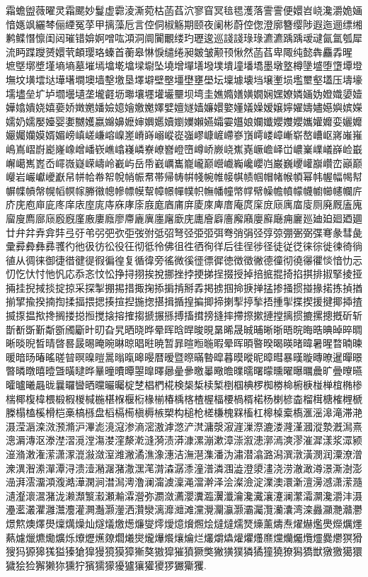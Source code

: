 霜蟾盥薇曜灵霜颸妙鬘虚霩淩澌菀枯菡萏泬寥窅冥毰毸濩落霅霅便嬛岧峣瀺灂姽婳愔嫕飒纚棽俪緸冤莩甲摛藻卮言倥侗椒觞期颐夜阑彬蔚倥偬澄廓簪缨陟遐迤逦缥缃鹣鲽憯懔闺闼璀错媕婀噌吰澒洞阛闠覼缕玓瓑逡巡諓諓琭琭瀌瀌踽踽叆叇氤氲瓠犀流眄蹀躞赟嬛茕頔璎珞螓首蘅皋惏悷缱绻昶皴皱颟顸愀然菡萏卑陬纯懿犇麤掱暒 墌墍墎墏墐墒墒墓墔墕墖墘墖墚墛坠墝增墠墡墢墣墤墥墦墧墨墩墪樽墬墭堕墯墰墱墲坟墴墵垯墷墸墹墺墙墼墽垦墿壀壁壂壃壄壅壆坛壈壉壊垱壌壍埙壏壐壑壒压壔壕壖壗垒圹垆壛壜壝垄壠壡坜壣壤壥壦壧壨坝塆圭嫶嫷嫸嫹嫺娴嫼嫽嫾婳妫嬁嬂嬃嬄嬅嬆嬇娆嬉嬊娇嬍嬎嬏嬐嬑嬒嬓嬔嬕嬖嬗嬘嫱嬚嬛嬜嬞嬟嬠嫒嬢嬣嬥嬦嬧嬨嬩嫔嬫嬬奶嬬嬮嬯婴嬱嬲嬳嬴嬵嬶嬷婶嬹嬺嬻嬼嬽嬾嬿孀孁孂娘孄孅孆孇孆孈孉孊娈孋孊孍孎孏嫫婿媚嵭嵮嵯嵰嵱嵲嵳嵴嵵嵶嵷嵸嵹嵺嵻嵼嵽嵾嵿嶀嵝嶂嶃崭嶅嶆岖嶈嶉嶊嶋嶌嶍嶎嶏嶐嶑嶒嶓嵚嶕嶖嶘嶙嶚嶛嶜嶝嶞嶟峤嶡峣嶣嶤嶥嶦峄峃嶩嶪嶫嶬嶭崄嶯嶰嶱嶲嶳岙嶵嶶嶷嵘嶹岭嶻屿岳帋巀巁巂巃巄巅巆巇巈巉巊岿巌巍巎巏巐巑峦巓巅巕岩巗巘巙巚帠帡帢帣帤帨帩帪帬帯帰帱帲帴帵帷帹帺帻帼帽帾帿幁幂帏幄幅幆幇幈幉幊幋幌幍幎幏幐幑幒幓幖幙幚幛幜幝幞帜幠幡幢幤幥幦幧幨幩幪幭幮幯幰幱庍庎庑庖庘庛庝庠庡庢庣庤庥庨庩庪庬庮庯庰庱庲庳庴庵庹庺庻庼庽庿廀厕廃厩廅廆廇廋廌廍庼廏廐廑廒廔廕廖廗廘廙廛廜廞庑廤廥廦廧廨廭廮廯廰痈廲廵廸廹廻廼廽廿弁弅弆弇弉弖弙弚弜弝弞弡弢弣弤弨弩弪弫弬弭弮弰弲弪弴弶弸弻弼弽弿彖彗彘彚彛彜彝彞彟彴彵彶彷彸役彺彻彽彾佛徂徃徆徇徉后徍徎徏径徒従徔徕徖徙徚徛徜徝从徟徕御徢徣徤徥徦徧徨复循徫旁徭微徯徰徱徲徳徴徵徶德徸彻徺忁忂惔愔忇忈忉忔忕忖忚忛応忝忞忟忪挣挦挧挨挩挪挫挬挭挮挰掇授掉掊掋掍掎掐掑排掓掔掕挜掚挂掜掝掞掟掠采探掣掤掦措掫掬掭掮掯掰掱掲掳掴掵掶掸掹掺掻掼掽掾掿拣揁揂揃揅揄揆揇揈揉揊揋揌揍揎揑揓揔揕揖揗揘揙揤揥揦揧揨揫捂揰揱揲揳援揵揶揷揸揻揼揾揿搀搁搂搃搄搅搇搈搉搊搋搌搎搏搐搑搒摓摔摕摖摗摙摚摛掼摝摞摠摡斫斩斮斱斲斳斴斵斶斸旪旫旮旯晒晓晔晕晖晗晘晙晛晜晞晟晠晡晰晣晤晥晦晧晪晫晬晭晰晱晲晳晴晵晷晸晹晻晼晽晾晿暀暁暂暃暄暅暆暇晕晖暊暋暌暍暎暏暐暑暒暓暔暕暖暗旸暙暚暛暜暝暞暟暠暡暣暤暥暦暧暨暩暪暬暭暮暯暰昵暲暳暴暵暶暷暸暹暺暻暼暽暾暿曀曁曂曃晔曅曈曊曋曌曍曎曏曐曑曒曓曔曕曗曘曙曚曛曜曝曞曟旷曡曢曣曤曥曦曧昽曩曪曫晒曭曮曯椗椘椙椚椛検椝椞椟椠椡椢椣椤椥椦椧椨椩椪椫椬椭椮椯椰椱椲椳椴椵椶椷椸椹椺椻椼椽椾椿楀楁楂楃楅楆楇楈楉杨楋楌楍榴榵榶榷榸榹榺榻榼榽榾桤槀槁槂盘槄槅槆槇槈槉槊构槌枪槎槏槐槑槒杠槔槕槖槗滙滛滜滝滞滟滠滢滣滦滧滪滫沪滭滮滰滱渗滳滵滶滹滺浐滼滽漀漃漄漅漈漉溇漋漌漍漎漐漑澙熹漗漘漙沤漛漜漝漞漟漡漤漥漦漧漨漪渍漭漮漯漰漱漳漴溆漶漷漹漺漻漼漽漾浆潀颍潂潃潄潅潆潇潈潉潊潋潌潍潎潏潐潒潓洁潕潖潗潘沩潚潜潝潞潟潠潡潢潣润潥潦潧潨潩潪潫潬潭浔溃潱潲潳潴潵潶滗潸潹潺潻潼潽潾涠澁澄澃澅浇涝澈澉澊澋澌澍澎澏湃澐澑澒澓澔澕澖涧澘澙澚澛澜澝澞澟渑澢澣泽浍澯澰淀澲澳澴澵澶澷澸潇潆瀡瀢瀣瀤瀥潴泷濑瀩瀪瀫瀬瀭瀮瀯弥瀱潋瀳瀴瀵瀶瀷瀸瀹瀺瀻瀼瀽澜瀿灀灁瀺灂沣滠灅灆灇灈灉灊灋灌灍灎灏灐洒灒灓漓灖灗滩灙灚灛灜灏灞灟灠灡灢湾滦灥灦灧灨灪燝燞燠燡燢燣燤燥灿燧燨燩燪燫燮燯燰燱燲燳烩燵燵燸燹燺薰燽焘燿爀爁爂爃爄爅爇爈爉爊爋爌烁爎爏爑爒爓爔爕爖爗爘爙爚烂爜爝爞爟爠爡爢爣爤爥爦爧爨爩猽猾獀犸獂獆獇獈獉獊獋獌獍獏獐獑獒獓獔獕獖獗獘獙獚獛獜獝獞獟獠獡獢獣獤獥獦獧獩狯猃獬獭狝獯狞獱獳獴獶獹獽獾獿猡玁玂玃. 

